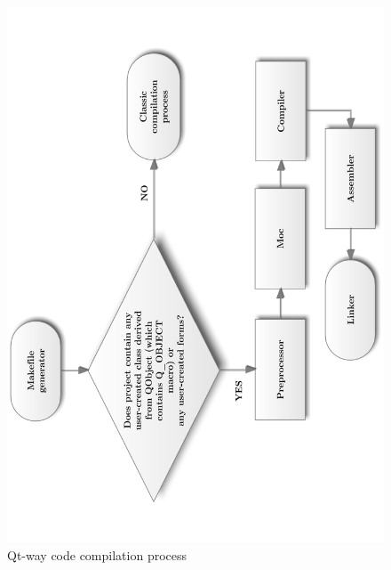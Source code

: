 \begin{figure}[ht]
\centering
\includegraphics[angle=-90,width=14.5cm]{graphics/laboratory/10-qtcomp.pdf}
\caption{Qt-way \cpp{} code compilation process}\label{figure:qtpr}
\end{figure}
